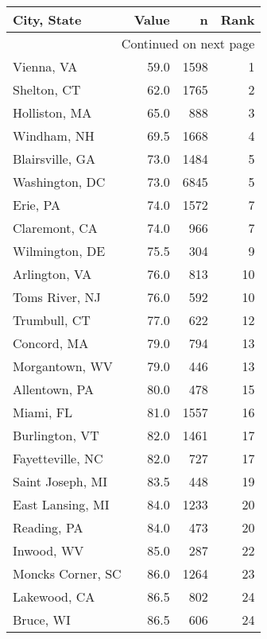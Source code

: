 \begin{longtable}{lrrr}
\toprule
City, State &  Value &  n &  Rank \\
\midrule
\endhead
\midrule
\multicolumn{4}{r}{{Continued on next page}} \\
\midrule
\endfoot

\bottomrule
\endlastfoot
Vienna, VA           &    59.0 &   1598 &     1 \\
Shelton, CT          &    62.0 &   1765 &     2 \\
Holliston, MA        &    65.0 &    888 &     3 \\
Windham, NH          &    69.5 &   1668 &     4 \\
Blairsville, GA      &    73.0 &   1484 &     5 \\
Washington, DC       &    73.0 &   6845 &     5 \\
Erie, PA             &    74.0 &   1572 &     7 \\
Claremont, CA        &    74.0 &    966 &     7 \\
Wilmington, DE       &    75.5 &    304 &     9 \\
Arlington, VA        &    76.0 &    813 &    10 \\
Toms River, NJ       &    76.0 &    592 &    10 \\
Trumbull, CT         &    77.0 &    622 &    12 \\
Concord, MA          &    79.0 &    794 &    13 \\
Morgantown, WV       &    79.0 &    446 &    13 \\
Allentown, PA        &    80.0 &    478 &    15 \\
Miami, FL            &    81.0 &   1557 &    16 \\
Burlington, VT       &    82.0 &   1461 &    17 \\
Fayetteville, NC     &    82.0 &    727 &    17 \\
Saint Joseph, MI     &    83.5 &    448 &    19 \\
East Lansing, MI     &    84.0 &   1233 &    20 \\
Reading, PA          &    84.0 &    473 &    20 \\
Inwood, WV           &    85.0 &    287 &    22 \\
Moncks Corner, SC    &    86.0 &   1264 &    23 \\
Lakewood, CA         &    86.5 &    802 &    24 \\
Bruce, WI            &    86.5 &    606 &    24 \\

\end{longtable}
